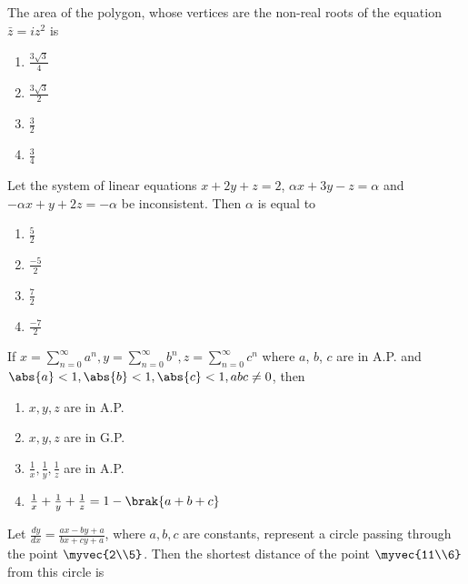 \iffalse
\title{2022}
\author{EE24BTECH11002}
\section{mcq-single}
\fi
    \item The area of the polygon, whose vertices are the non-real roots of the equation $\bar{z} = iz^2$ is
    \hfill{}

	\begin{enumerate}
		\item $\frac{3\sqrt{3}}{4}$
		\item $\frac{3\sqrt{3}}{2}$
		\item $\frac{3}{2}$
		\item $\frac{3}{4}$
	\end{enumerate}

    \item Let the system of linear equations $x + 2y + z = 2$, $\alpha x + 3y - z = \alpha$ and $-\alpha x + y + 2z = -\alpha$ be inconsistent. Then $\alpha$ is equal to
    \hfill{}

	\begin{enumerate}
		\item $\frac{5}{2}$
		\item $\frac{-5}{2}$
		\item $\frac{7}{2}$
		\item $\frac{-7}{2}$
	\end{enumerate}

    \item If $x = \sum^{\infty}_{n = 0} a^n,  y = \sum^{\infty}_{n = 0} b^n,  z = \sum^{\infty}_{n = 0} c^n$ where $a$, $b$, $c$ are in A.P. and $\abs{a} < 1, \abs{b} < 1, \abs{c} < 1, abc \neq 0$, then  
    \hfill{}

	\begin{enumerate}
		\item $x, y, z$ are in A.P. 
		\item $x, y, z$ are in G.P. 
		\item $\frac{1}{x}, \frac{1}{y}, \frac{1}{z}$ are in A.P. 
		\item $\frac{1}{x} + \frac{1}{y} + \frac{1}{z} = 1 - \brak{a + b+ c}$ 
	\end{enumerate}


    \item Let $\frac{dy}{dx} = \frac{ax - by + a}{bx + cy + a}$, where $a, b, c$ are constants, represent a circle passing through the point $\myvec{2\\5}$. Then the shortest distance of the point $\myvec{11\\6}$ from this circle is 
    \hfill{}

